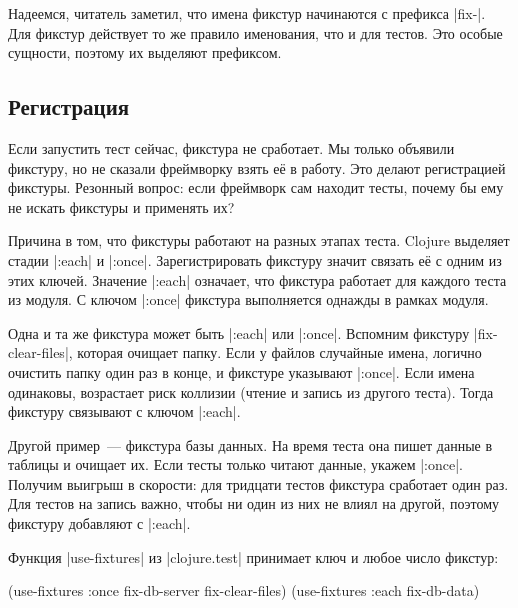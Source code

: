 Надеемся, читатель заметил, что имена фикстур начинаются с префикса
\spverb|fix-|. Для фикстур действует то же правило именования, что и для
тестов. Это особые сущности, поэтому их выделяют префиксом.

\subsection{Регистрация}


Если запустить тест сейчас, фикстура не сработает. Мы только объявили фикстуру,
но не сказали фреймворку взять её в работу. Это делают регистрацией фикстуры.
Резонный вопрос: если фреймворк сам находит тесты, почему бы ему не искать
фикстуры и применять их?

Причина в том, что фикстуры работают на разных этапах теста. Clojure выделяет
стадии \spverb|:each| и \spverb|:once|. Зарегистрировать фикстуру значит связать
её с одним из этих ключей. Значение \spverb|:each| означает, что фикстура
работает для каждого теста из модуля. С ключом \spverb|:once| фикстура
выполняется однажды в рамках модуля.


Одна и та же фикстура может быть \spverb|:each| или \spverb|:once|. Вспомним
фикстуру \spverb|fix-clear-files|, которая очищает папку. Если у файлов
случайные имена, логично очистить папку один раз в конце, и фикстуре указывают
\spverb|:once|. Если имена одинаковы, возрастает риск коллизии (чтение и запись
из другого теста). Тогда фикстуру связывают с ключом \spverb|:each|.

Другой пример~--- фикстура базы данных. На время теста она пишет данные в
таблицы и очищает их. Если тесты только читают данные, укажем
\spverb|:once|. Получим выигрыш в скорости: для тридцати тестов фикстура
сработает один раз. Для тестов на запись важно, чтобы ни один из них не влиял на
другой, поэтому фикстуру добавляют с \spverb|:each|.

Функция \spverb|use-fixtures| из \spverb|clojure.test| принимает ключ и любое
число фикстур:


\begin{english}
  \begin{clojure}
(use-fixtures :once fix-db-server fix-clear-files)
(use-fixtures :each fix-db-data)
  \end{clojure}
\end{english}

